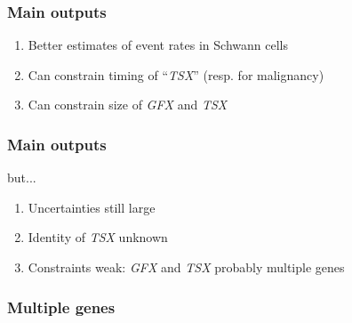 \documentclass{beamer}
\begin{document}
\begin{frame}
    \frametitle{Main outputs}
    \begin{enumerate}
        \item Better estimates of event rates in Schwann cells
        \item Can constrain timing of ``\emph{TSX}'' (resp. for malignancy)
        \item Can constrain size of \emph{GFX} and \emph{TSX}
    \end{enumerate}
\end{frame}

\begin{frame}
    \frametitle{Main outputs}
    but...
    \begin{enumerate}
        \item Uncertainties still large
        \item Identity of \emph{TSX} unknown
        \item Constraints weak: \emph{GFX} and \emph{TSX} probably multiple genes
    \end{enumerate}
\end{frame}

\begin{frame}
    \frametitle{Multiple genes}

\end{frame}
\end{document}
